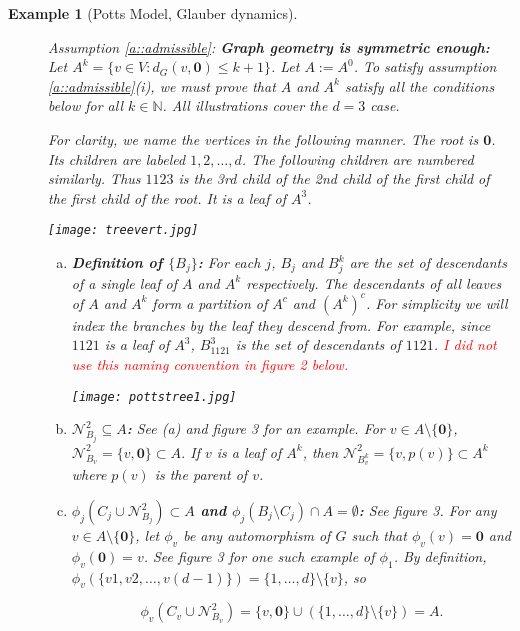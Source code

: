 \documentclass[12pt]{article}
\newcommand{\mb}{\mathbb}
\newcommand{\mc}{\mathcal}
\newcommand{\tr}{\textcolor{red}}
\newcommand{\ind}{\hspace{24pt}}
\newcommand{\defeq}{:=}								%
\newcommand{\dneigh}[1]{\mc{N}^2_{#1}}			%
\renewcommand{\root}{\mathbf{0}}					%
\newcommand{\indx}[1]{^{#1}}						%
\newtheorem{example}[thms]{Example}
\begin{document}
\begin{example}[Potts Model, Glauber dynamics]
\begin{description}
\item[] Assumption \ref{a::admissible}: \textbf{Graph geometry is symmetric enough:} Let \(A\indx{k} = \{v \in V: d_G(v,\root) \leq k+1\}\). Let \(A \defeq A\indx{0}\). To satisfy assumption \ref{a::admissible}(i), we must prove that \(A\) and \(A\indx{k}\) satisfy all the conditions below for all \(k\in\mb{N}\). All illustrations cover the \(d=3\) case.

\ind For clarity, we name the vertices in the following manner. The root is \(\root\). Its children are labeled \(1,2,\dots,d\). The following children are numbered similarly. Thus \(1123\) is the 3rd child of the 2nd child of the first child of the first child of the root. It is a leaf of \(A\indx{3}\).

\texttt{[image: treevert.jpg]}

\begin{enumerate}[(a)]
\item {\bfseries\boldmath Definition of \(\{B_j\}\):} For each \(j\), \(B_j\) and \(B\indx{k}_j\) are the set of descendants of a single leaf of \(A\) and \(A\indx{k}\) respectively. The descendants of all leaves of \(A\) and \(A\indx{k}\) form a partition of \(A^c\) and \((A\indx{k})^c\). For simplicity we will index the branches by the leaf they descend from. For example, since \(1121\) is a leaf of \(A\indx{3}\), \(B\indx{3}_{1121}\) is the set of descendants of \(1121\). \tr{I did not use this naming convention in figure 2 below.}

\texttt{[image: pottstree1.jpg]}

\item {\bfseries\boldmath\(\dneigh{B_j} \subseteq A\):} See (a) and figure 3 for an example. For \(v \in A\setminus\{\root\}\), \(\dneigh{B_v} = \{v,\root\} \subset A\). If \(v\) is a leaf of \(A\indx{k}\), then \(\dneigh{B\indx{k}_v} = \{v,p(v)\}\subset A\indx{k}\) where \(p(v)\) is the parent of \(v\).

\item {\bfseries\boldmath\(\phi_j(C_j\cup\dneigh{B_j}) \subset A\) and \(\phi_j(B_j\setminus C_j) \cap A = \emptyset\):} See figure 3. For any \(v \in A\setminus \{\root\}\), let \(\phi_v\) be any automorphism of \(G\) such that \(\phi_v(v) = \root\) and \(\phi_v(\root) = v\). See figure 3 for one such example of \(\phi_1\). By definition, \(\phi_v(\{v1,v2,\dots,v(d-1)\}) = \{1,\dots,d\}\setminus \{v\}\), so

\[\phi_v(C_v\cup\dneigh{B_v}) = \{v,\root\}\cup(\{1,\dots,d\}\setminus \{v\}) = A.\]


\end{enumerate}
\end{description}
\end{example}
\end{document}
